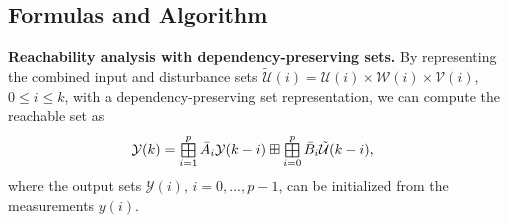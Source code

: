 \documentclass{article}
\begin{document}
\subsection{Formulas and Algorithm}
\setcounter{proposition}{2}
\setcounter{equation}{5}
\begin{proposition}\label{theo:reach_zon}\textbf{Reachability analysis with dependency-preserving sets.}
By representing the combined input and disturbance sets $\tilde{\mathcal{U}}(i)={\mathcal{U}}(i) \times {\mathcal{W}}(i) \times {\mathcal{V}}(i)$, $0\leq i\leq k$, with a dependency-preserving set representation, 
we can compute the reachable set as
\begin{align}
    \mathcal{Y}(k) &= \bigboxplus_{i=1}^p \bar{A}_{i} \mathcal{Y}(k-i) \boxplus \bigboxplus_{i=0}^p \bar{B}_{i} \tilde{\mathcal{U}}(k-i), \label{eq:ARMAXzon_reach}
\end{align}
where the output sets $\mathcal{Y}(i)$, $i=0,...,p-1$, can be initialized from the measurements $y(i)$.
\end{proposition}
\end{document}
